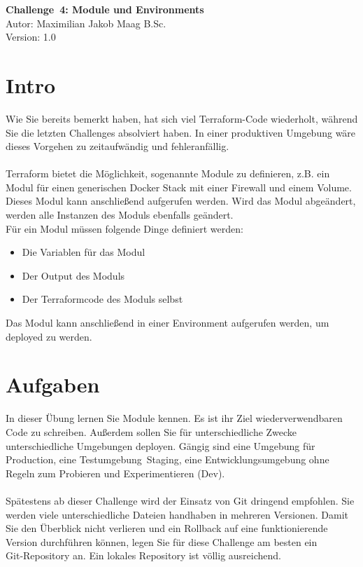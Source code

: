 \documentclass{article}
\begin{document}
    \begin{center}
        \Large \textbf{Challenge 4: Module und Environments} \\ [6pt]
        \normalsize
        Autor: Maximilian Jakob Maag B.Sc. \\
        Version: 1.0
    \end{center}
    \section{Intro}
    Wie Sie bereits bemerkt haben, hat sich viel Terraform-Code wiederholt, während Sie die letzten Challenges absolviert haben.
    In einer produktiven Umgebung wäre dieses Vorgehen zu zeitaufwändig und fehleranfällig. \\ \\
    Terraform bietet die Möglichkeit, sogenannte Module zu definieren, z.B. ein Modul für einen generischen Docker Stack mit einer Firewall und einem Volume.
    Dieses Modul kann anschließend aufgerufen werden. Wird das Modul abgeändert, werden alle Instanzen des Moduls ebenfalls geändert. \\
    Für ein Modul müssen folgende Dinge definiert werden: \\
    \begin{itemize}
        \item Die Variablen für das Modul
        \item Der Output des Moduls
        \item Der Terraformcode des Moduls  selbst
    \end{itemize}
    Das Modul kann anschließend in einer Environment aufgerufen werden, um deployed zu werden. \\
    \section{Aufgaben}
    In dieser Übung lernen Sie Module kennen. Es ist ihr Ziel wiederverwendbaren Code zu schreiben. Außerdem sollen Sie für unterschiedliche Zwecke unterschiedliche Umgebungen deployen.
    Gängig sind eine Umgebung für Production, eine Testumgebung Staging, eine Entwicklungsumgebung ohne Regeln zum Probieren und Experimentieren (Dev). \\ \\
    Spätestens ab dieser Challenge wird der Einsatz von Git dringend empfohlen. Sie werden viele unterschiedliche Dateien handhaben in mehreren Versionen.
    Damit Sie den Überblick nicht verlieren und ein Rollback auf eine funktionierende Version durchführen können, legen Sie für diese Challenge am besten ein Git‑Repository an.
    Ein lokales Repository ist völlig ausreichend.
\end{document}
